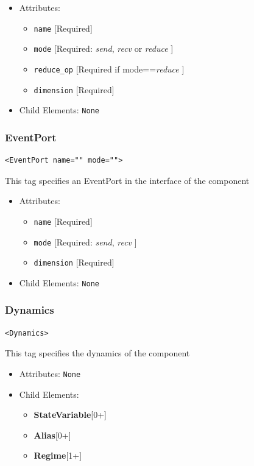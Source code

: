 \documentclass{article}
\newcommand{\StateVariable}{{\bf{StateVariable}}\xspace}
\newcommand{\Alias}{{\bf{Alias}}\xspace}
\newcommand{\Regime}{{\bf{Regime}}\xspace}
\begin{document}
\begin{itemize}
\item Attributes:
%
\begin{itemize}
\item \verb|name| {[}Required{]}
\item \verb|mode| {[}Required: \emph{send}, \emph{recv} or \emph{reduce} {]}
\item \verb|reduce_op| {[}Required if mode==\emph{reduce} {]}
\item \verb|dimension| {[}Required{]}
\end{itemize}

\item Child Elements: \texttt{None}
\end{itemize}

\subsubsection{EventPort}
%
\begin{lstlisting}
<EventPort name="" mode="">
\end{lstlisting}

This tag specifies an EventPort in the interface of the component

\begin{itemize}
\item Attributes:
%
\begin{itemize}
\item \verb|name| {[}Required{]}
\item \verb|mode| {[}Required: \emph{send}, \emph{recv} {]}
\item \verb|dimension| {[}Required{]}
\end{itemize}

\item Child Elements: \texttt{None}
\end{itemize}

\subsubsection{Dynamics}
%
\begin{lstlisting}
<Dynamics>
\end{lstlisting}

This tag specifies the dynamics of the component

\begin{itemize}
\item Attributes: \texttt{None}

\item Child Elements:
%
\begin{itemize}
\item \StateVariable {[}0+{]}
\item \Alias {[}0+{]}
\item \Regime {[}1+{]}
\end{itemize}

\end{itemize}
\end{document}

